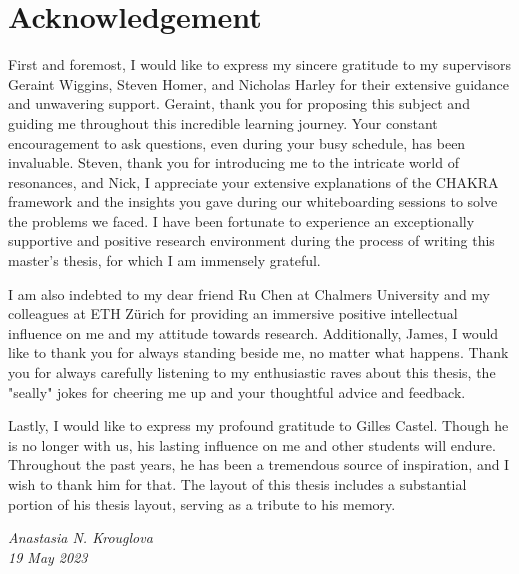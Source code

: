 \chapter*{Acknowledgement}
\label{ch:acknowledgement}

First and foremost, I would like to express my sincere gratitude to my supervisors Geraint Wiggins, Steven Homer, and Nicholas Harley for their extensive guidance and unwavering support. Geraint, thank you for proposing this subject and guiding me throughout this incredible learning journey. Your constant encouragement to ask questions, even during your busy schedule, has been invaluable. Steven, thank you for introducing me to the intricate world of resonances, and Nick, I appreciate your extensive explanations of the CHAKRA framework and the insights you gave during our whiteboarding sessions to solve the problems we faced. I have been fortunate to experience an exceptionally supportive and positive research environment during the process of writing this master's thesis, for which I am immensely grateful.

I am also indebted to my dear friend Ru Chen at Chalmers University and my colleagues at ETH Zürich for providing an immersive positive intellectual influence on me and my attitude towards research. Additionally, James, I would like to thank you for always standing beside me, no matter what happens. 
Thank you for always carefully listening to my enthusiastic raves about this thesis,  the "seally" jokes for cheering me up and your thoughtful advice and feedback.


Lastly, I would like to express my profound gratitude to Gilles Castel. Though he is no longer with us, his lasting influence on me and other students will endure. Throughout the past years, he has been a tremendous source of inspiration, and I wish to thank him for that. The layout of this thesis includes a substantial portion of his thesis layout, serving as a tribute to his memory.



{\raggedleft \textit{Anastasia N. Krouglova} \\ \textit{19 May 2023}

}

